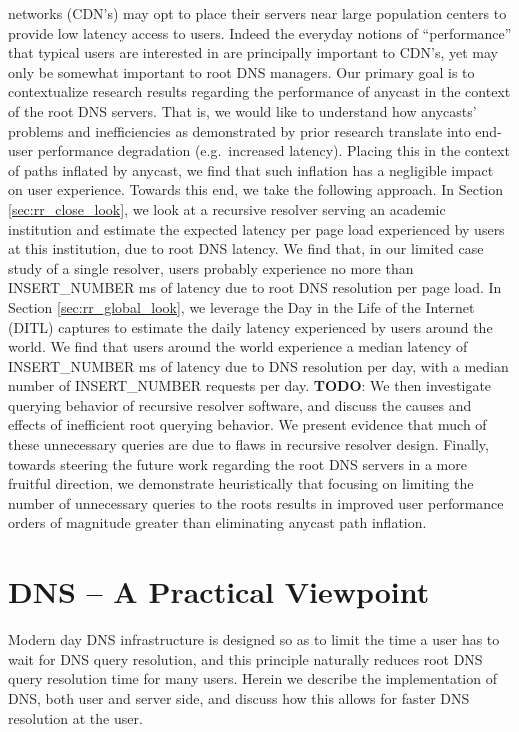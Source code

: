 \documentclass[sigconf,nonacm,10pt]{acmart}
\begin{document}
networks (CDN's) may opt to place their servers near large population
centers to provide low latency access to users. Indeed the everyday
notions of ``performance'' that typical users are interested in are
principally important to CDN's, yet may only be somewhat important to
root DNS managers. \break \break
Our primary goal is to contextualize research results regarding the
performance of anycast in the context of the root DNS servers. That is,
we would like to understand how anycasts' problems and inefficiencies as
demonstrated by prior research translate into end-user performance
degradation (e.g.~increased latency). Placing this in the context of
paths inflated by anycast, we find that such inflation has a negligible
impact on user experience. \break
Towards this end, we take the following approach. In Section
\ref{sec:rr_close_look}, we look at a recursive resolver serving an
academic institution and estimate the expected latency per page load
experienced by users at this institution, due to root DNS latency. We
find that, in our limited case study of a single resolver, users
probably experience no more than INSERT\_NUMBER ms of latency due to
root DNS resolution per page load. In Section \ref{sec:rr_global_look},
we leverage the Day in the Life of the Internet (DITL) captures to
estimate the daily latency experienced by users around the world. We
find that users around the world experience a median latency of
INSERT\_NUMBER ms of latency due to DNS resolution per day, with a
median number of INSERT\_NUMBER requests per day. \textbf{TODO}: We then
investigate querying behavior of recursive resolver software, and
discuss the causes and effects of inefficient root querying behavior. We
present evidence that much of these unnecessary queries are due to flaws
in recursive resolver design. Finally, towards steering the future work
regarding the root DNS servers in a more fruitful direction, we
demonstrate heuristically that focusing on limiting the number of
unnecessary queries to the roots results in improved user performance
orders of magnitude greater than eliminating anycast path inflation.

\section{DNS -- A Practical
Viewpoint}\label{dns-a-practical-viewpoint-1}

\label{sec:dns_practical_viewpoint} Modern day DNS infrastructure is
designed so as to limit the time a user has to wait for DNS query
resolution, and this principle naturally reduces root DNS query
resolution time for many users. Herein we describe the implementation of
DNS, both user and server side, and discuss how this allows for faster
DNS resolution at the user.
\end{document}
